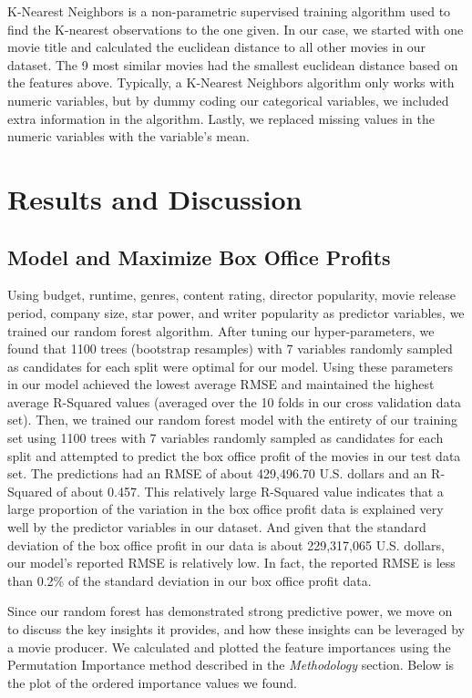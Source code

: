 \documentclass[10pt]{article}
\begin{document}
K-Nearest Neighbors is a non-parametric supervised training algorithm used to find the K-nearest observations to the one given. In our case, we started with one movie title and calculated the euclidean distance to all other movies in our dataset. The 9 most similar movies had the smallest euclidean distance based on the features above. Typically, a K-Nearest Neighbors algorithm only works with numeric variables, but by dummy coding our categorical variables, we included extra information in the algorithm. Lastly, we replaced missing values in the numeric variables with the variable’s mean.

\section{Results and Discussion}
\subsection{Model and Maximize Box Office Profits}

Using budget, runtime, genres, content rating, director popularity, movie release period, company size, star power, and writer popularity as predictor variables, we trained our random forest algorithm. After tuning our hyper-parameters, we found that 1100 trees (bootstrap resamples) with 7 variables randomly sampled as candidates for each split were optimal for our model. Using these parameters in our model achieved the lowest average RMSE and maintained the highest average R-Squared values (averaged over the 10 folds in our cross validation data set). Then, we trained our random forest model with the entirety of our training set using 1100 trees with 7 variables randomly sampled as candidates for each split and attempted to predict the box office profit of the movies in our test data set. The predictions had an RMSE of about 429,496.70 U.S. dollars and an R-Squared of about 0.457. This relatively large R-Squared value indicates that a large proportion of the variation in the box office profit data is explained very well by the predictor variables in our dataset. And given that the standard deviation of the box office profit in our data is about 229,317,065 U.S. dollars, our model’s reported RMSE is relatively low. In fact, the reported RMSE is less than 0.2\% of the standard deviation in our box office profit data.

Since our random forest has demonstrated strong predictive power, we move on to discuss the key insights it provides, and how these insights can be leveraged by a movie producer. We calculated and plotted the feature importances using the Permutation Importance method described in the \textit{Methodology} section. Below is the plot of the ordered importance values we found.
\end{document}

